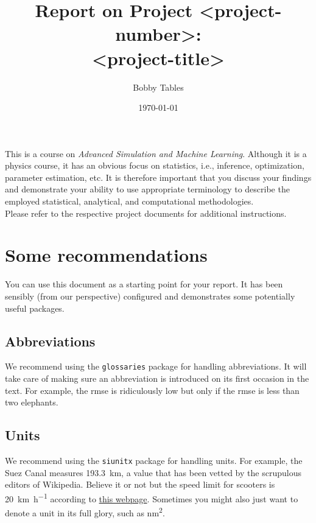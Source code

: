 \documentclass[12pt,a4paper]{article}
\begin{document}
\lstset{language=Python}

\title{
    \sffamily
    Report on Project <project-number>: \\
    <project-title>
}
\author{Bobby Tables}
\date{\today}

\maketitle

This is a course on \textit{Advanced Simulation and Machine Learning}. Although it is a physics course, it has an obvious focus on statistics, i.e., inference, optimization, parameter estimation, etc. It is therefore important that you discuss your findings and demonstrate your ability to use appropriate terminology to describe the employed statistical, analytical, and computational methodologies.\\

Please refer to the respective project documents for additional instructions.

\section{Some recommendations}

You can use this document as a starting point for your report.
It has been sensibly (from our perspective) configured and demonstrates some potentially useful packages.

\subsection{Abbreviations}

We recommend using the \texttt{glossaries} package for handling abbreviations.
It will take care of making sure an abbreviation is introduced on its first occasion in the text.
For example, the \gls{rmse} is ridiculously low but only if the \gls{rmse} is less than two elephants.

\subsection{Units}

We recommend using the \texttt{siunitx} package for handling units.
For example, the Suez Canal measures \SI{193.3}{\kilo\meter}, a value that has been vetted by the scrupulous editors of Wikipedia.
Believe it or not but the speed limit for scooters is \SI{20}{\kilo\meter\per\hour} according to \href{https://scotsman.me/post/what-s-the-law-on-riding-a-scooter-in-sweden}{this webpage}.
Sometimes you might also just want to denote a unit in its full glory, such as \si{\nano\meter\squared}.
\end{document}
